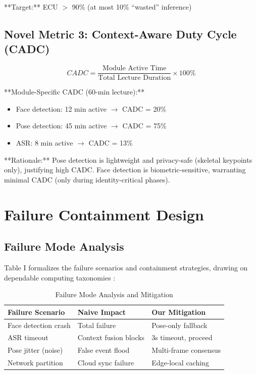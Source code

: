 \documentclass[conference]{IEEEtran}
\begin{document}
**Target:** ECU $>$ 90\% (at most 10\% ``wasted'' inference)

\subsection{Novel Metric 3: Context-Aware Duty Cycle (CADC)}
\begin{equation}
CADC = \frac{\text{Module Active Time}}{\text{Total Lecture Duration}} \times 100\%
\end{equation}

**Module-Specific CADC (60-min lecture):**
\begin{itemize}
    \item Face detection: 12 min active $\to$ CADC = 20\%
    \item Pose detection: 45 min active $\to$ CADC = 75\%
    \item ASR: 8 min active $\to$ CADC = 13\%
\end{itemize}

**Rationale:** Pose detection is lightweight and privacy-safe (skeletal keypoints only), justifying high CADC. Face detection is biometric-sensitive, warranting minimal CADC (only during identity-critical phases).

\section{Failure Containment Design}

\subsection{Failure Mode Analysis}
Table I formalizes the failure scenarios and containment strategies, drawing on dependable computing taxonomies \cite{b18}:

\begin{table}[htbp]
\caption{Failure Mode Analysis and Mitigation}
\begin{center}
\begin{tabular}{lll}
\toprule
\textbf{Failure Scenario} & \textbf{Naive Impact} & \textbf{Our Mitigation} \\
\midrule
Face detection crash & Total failure & Pose-only fallback \\
ASR timeout & Context fusion blocks & 3s timeout, proceed \\
Pose jitter (noise) & False event flood & Multi-frame consensus \\
Network partition & Cloud sync failure & Edge-local caching \\
\bottomrule
\end{tabular}
\end{center}
\end{table}
\end{document}
